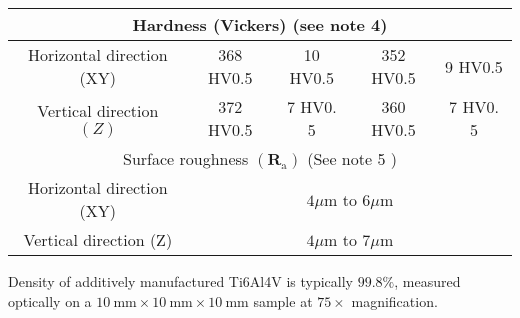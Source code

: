 \documentclass[10pt]{article}
\begin{document}
\begin{center}
\begin{tabular}{|c|c|c|c|c|}
\hline
\multicolumn{5}{|c|}{Hardness (Vickers) (see note 4)} \\
\hline
Horizontal direction (XY) & 368 HV0.5 & 10 HV0.5 & 352 HV0.5 & 9 HV0.5 \\
\hline
Vertical direction $(Z)$ & 372 HV0.5 & 7 HV0. 5 & 360 HV0.5 & 7 HV0. 5 \\
\hline
\multicolumn{5}{|c|}{Surface roughness $\left(\mathbf{R}_{\mathrm{a}}\right)$ (See note 5 )} \\
\hline
Horizontal direction (XY) & \multicolumn{4}{|c|}{$4 \mu \mathrm{m}$ to $6 \mu \mathrm{m}$} \\
\hline
Vertical direction (Z) & \multicolumn{4}{|c|}{$4 \mu \mathrm{m}$ to $7 \mu \mathrm{m}$} \\
\hline
\end{tabular}
\end{center}

Density of additively manufactured Ti6Al4V is typically $99.8 \%$, measured optically on a $10 \mathrm{~mm} \times 10 \mathrm{~mm} \times 10 \mathrm{~mm}$ sample at $75 \times$ magnification.
\end{document}
